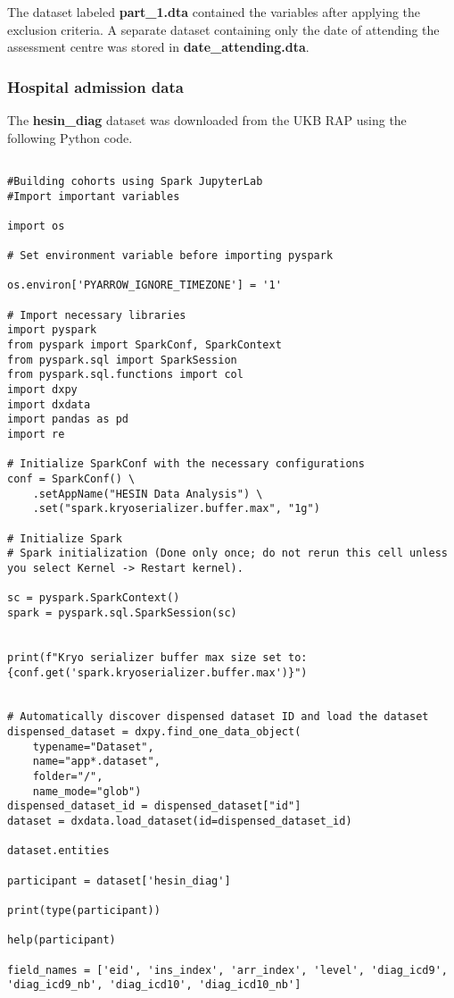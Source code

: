 \documentclass[11pt]{article}
\begin{document}
The dataset labeled \textbf{part\_1.dta} contained the variables after applying the exclusion criteria. A separate dataset containing only the date of attending the assessment centre was stored in \textbf{date\_attending.dta}.

\subsubsection{Hospital admission data}

The \textbf{hesin\_diag} dataset was downloaded from the UKB RAP using the following Python code.
\color{violet}
\begin{lstlisting}[style=PythonStyle]

#Building cohorts using Spark JupyterLab
#Import important variables

import os

# Set environment variable before importing pyspark

os.environ['PYARROW_IGNORE_TIMEZONE'] = '1'

# Import necessary libraries
import pyspark
from pyspark import SparkConf, SparkContext
from pyspark.sql import SparkSession
from pyspark.sql.functions import col
import dxpy
import dxdata
import pandas as pd
import re

# Initialize SparkConf with the necessary configurations
conf = SparkConf() \
    .setAppName("HESIN Data Analysis") \
    .set("spark.kryoserializer.buffer.max", "1g")

# Initialize Spark
# Spark initialization (Done only once; do not rerun this cell unless you select Kernel -> Restart kernel).

sc = pyspark.SparkContext()
spark = pyspark.sql.SparkSession(sc)


print(f"Kryo serializer buffer max size set to: {conf.get('spark.kryoserializer.buffer.max')}")


# Automatically discover dispensed dataset ID and load the dataset
dispensed_dataset = dxpy.find_one_data_object(
    typename="Dataset", 
    name="app*.dataset", 
    folder="/", 
    name_mode="glob")
dispensed_dataset_id = dispensed_dataset["id"]
dataset = dxdata.load_dataset(id=dispensed_dataset_id)

dataset.entities

participant = dataset['hesin_diag']

print(type(participant))

help(participant)

field_names = ['eid', 'ins_index', 'arr_index', 'level', 'diag_icd9', 'diag_icd9_nb', 'diag_icd10', 'diag_icd10_nb']


\end{lstlisting}
\end{document}
